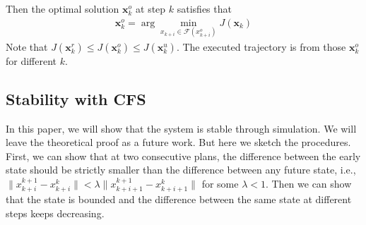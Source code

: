 \documentclass{ifacconf}
\begin{document}
Then the optimal solution $\mathbf{x}_k^{o}$ at step $k$ satisfies that
\begin{eqnarray}
\mathbf{x}_k^{o} = \arg\min_{x_{k+i}\in \mathcal{F}(x_{k+i}^o)}J(\mathbf{x}_k)
\end{eqnarray}
Note that $J(\mathbf{x}_k^{r})\leq J(\mathbf{x}_k^{o})\leq J(\mathbf{x}_k^{u})$. 
The executed trajectory is from those $\mathbf{x}_k^{o}$ for different $k$.


\subsection{Stability with CFS}
In this paper, we will show that the system is stable through simulation. We will leave the theoretical proof as a future work. But here we sketch the procedures. First, we can show that at two consecutive plans, the difference between the early state should be strictly smaller than the difference between any future state, i.e., $\|x_{k+i}^{k+1}-x_{k+i}^k\|<\lambda\|x_{k+i+1}^{k+1}-x_{k+i+1}^k\|$ for some $\lambda<1$. Then we can show that the state is bounded and the difference between the same state at different steps keeps decreasing.
%
%
             
\end{document}
